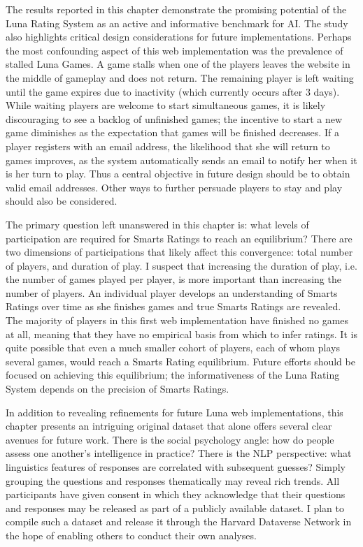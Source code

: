 The results reported in this chapter demonstrate the promising potential of the Luna Rating System as an active and informative benchmark for AI. The study also highlights critical design considerations for future implementations. Perhaps the most confounding aspect of this web implementation was the prevalence of stalled Luna Games. A game stalls when one of the players leaves the website in the middle of gameplay and does not return. The remaining player is left waiting until the game expires due to inactivity (which currently occurs after $3$ days). While waiting players are welcome to start simultaneous games, it is likely discouraging to see a backlog of unfinished games; the incentive to start a new game diminishes as the expectation that games will be finished decreases. If a player registers with an email address, the likelihood that she will return to games improves, as the system automatically sends an email to notify her when it is her turn to play. Thus a central objective in future design should be to obtain valid email addresses. Other ways to further persuade players to stay and play should also be considered.

The primary question left unanswered in this chapter is: what levels of participation are required for Smarts Ratings to reach an equilibrium? There are two dimensions of participations that likely affect this convergence: total number of players, and duration of play. I suspect that increasing the duration of play, i.e. the number of games played per player, is more important than increasing the number of players. An individual player develops an understanding of Smarts Ratings over time as she finishes games and true Smarts Ratings are revealed. The majority of players in this first web implementation have finished no games at all, meaning that they have no empirical basis from which to infer ratings. It is quite possible that even a much smaller cohort of players, each of whom plays several games, would reach a Smarts Rating equilibrium. Future efforts should be focused on achieving this equilibrium; the informativeness of the Luna Rating System depends on the precision of Smarts Ratings.

In addition to revealing refinements for future Luna web implementations, this chapter presents an intriguing original dataset that alone offers several clear avenues for future work. There is the social psychology angle: how do people assess one another's intelligence in practice? There is the NLP perspective: what linguistics features of responses are correlated with subsequent guesses? Simply grouping the questions and responses thematically may reveal rich trends. All participants have given consent in which they acknowledge that their questions and responses may be released as part of a publicly available dataset. I plan to compile such a dataset and release it through the Harvard Dataverse Network in the hope of enabling others to conduct their own analyses.

